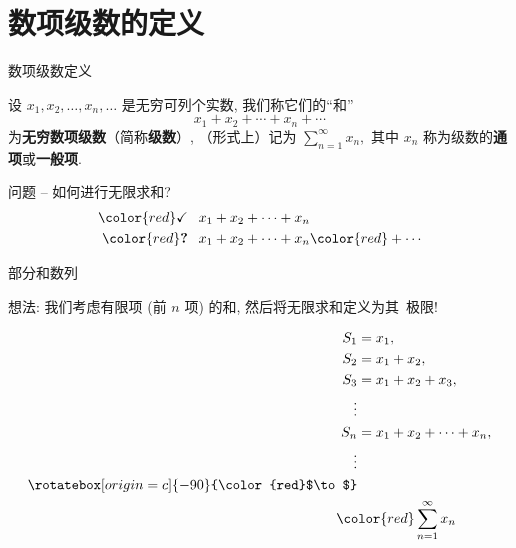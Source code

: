 
\section[定义]{数项级数的定义}


\begin{frame}{数项级数定义}

设 $x_1, x_2, \dots, x_n, \dots$ 是无穷可列个实数, 我们称它们的{\color{red}``和''}
\[x_1 + x_2 + \cdots + x_n + \cdots\]
为\textbf{无穷数项级数}（简称\textbf{级数}）, （形式上）记为 $\sum\limits_{n=1}^\infty x_n,$ 其中 $x_n$ 称为级数的\textbf{通项}或\textbf{一般项}.

\pause
\vspace*{0.5em}

\begin{block}{{\larger 问题} -- 如何进行无限求和?}
\vspace*{-1em}
{\larger[1]
\begin{align*}
{\color{red}\checkmark} & \phantom{+} x_1 + x_2 + \cdots + x_n \\
{\color{red}\textbf{?}} & \phantom{+} x_1 + x_2 + \cdots + x_n {\color{red} + \cdots}
\end{align*}
}
\end{block}

\end{frame}


\begin{frame}{部分和数列}

想法: 我们考虑有限项 (前 $n$ 项) 的和, 然后将无限求和定义为其~{\color{red}极限}!

\pause

\begin{align*}
S_1 & = x_1, \\
S_2 & = x_1 + x_2, \\
S_3 & = x_1 + x_2 + x_3, \\
\vdots & \\
S_n & = x_1 + x_2 + \cdots + x_n, \\
\vdots \\
\rotatebox[origin=c]{-90}{\color{red}$\to$} \\
& \hspace*{-1.5em} {\color{red}\sum\limits_{n=1}^\infty x_n}
\end{align*}

\end{frame}

